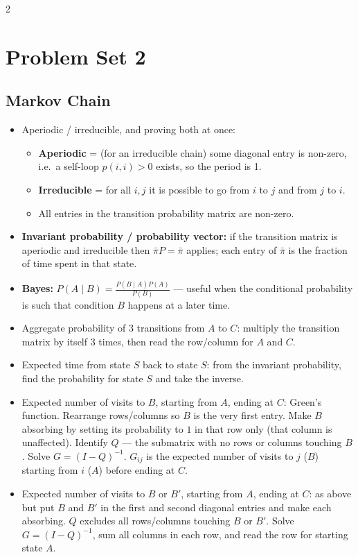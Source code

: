 \documentclass[8pt,letterpaper]{extarticle}
\begin{document}
\begin{multicols}{2}
\section{Problem Set 2}
\subsection{Markov Chain}
\begin{itemize}
  \item Aperiodic / irreducible, and proving both at once:
    \begin{itemize}
      \item \textbf{Aperiodic} = (for an irreducible chain) some diagonal entry is non-zero, i.e.\ a self-loop $p(i,i)>0$ exists, so the period is 1.
      \item \textbf{Irreducible} = for all $i,j$ it is possible to go from $i$ to $j$ and from $j$ to $i$.
      \item All entries in the transition probability matrix are non-zero.
    \end{itemize}
  \item \textbf{Invariant probability / probability vector:} if the transition matrix is aperiodic and irreducible then $\bar{\pi}P=\bar{\pi}$ applies; each entry of $\bar{\pi}$ is the fraction of time spent in that state.
  \item \textbf{Bayes:} $P(A\mid B)=\frac{P(B\mid A)P(A)}{P(B)}$ --- useful when the conditional probability is such that condition $B$ happens at a later time.
  \item Aggregate probability of 3 transitions from $A$ to $C$: multiply the transition matrix by itself 3 times, then read the row/column for $A$ and $C$.
  \item Expected time from state $S$ back to state $S$: from the invariant probability, find the probability for state $S$ and take the inverse.
  \item Expected number of visits to $B$, starting from $A$, ending at $C$: Green's function. Rearrange rows/columns so $B$ is the very first entry. Make $B$ absorbing by setting its probability to $1$ in that row only (that column is unaffected). Identify $Q$ --- the submatrix with no rows or columns touching $B$. Solve $G=(I-Q)^{-1}$. $G_{ij}$ is the expected number of visits to $j$ ($B$) starting from $i$ ($A$) before ending at $C$.
  \item Expected number of visits to $B$ or $B'$, starting from $A$, ending at $C$: as above but put $B$ and $B'$ in the first and second diagonal entries and make each absorbing. $Q$ excludes all rows/columns touching $B$ or $B'$. Solve $G=(I-Q)^{-1}$, sum all columns in each row, and read the row for starting state $A$.

\end{itemize}
\end{multicols}
\end{document}
